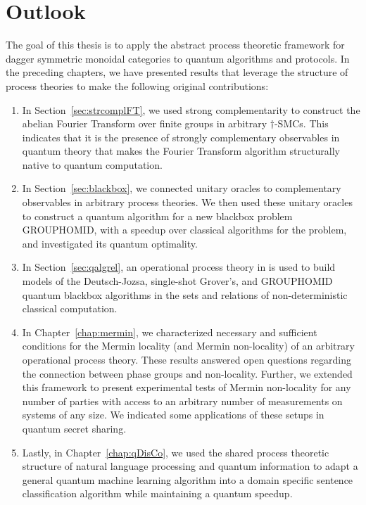 \chapter{Outlook}
\label{chap:outlook}

The goal of this thesis is to apply the abstract process theoretic framework for dagger symmetric monoidal categories to quantum algorithms and protocols.  In the preceding chapters, we have presented results that leverage the structure of process theories to make the following original contributions:
\begin{enumerate}
\item In Section~\ref{sec:strcomplFT}, we used strong complementarity to construct the abelian Fourier Transform over finite groups in arbitrary $\dagger$-SMCs. This indicates that it is the presence of strongly complementary observables in quantum theory that makes the Fourier Transform algorithm structurally native to quantum computation.

\item In Section~\ref{sec:blackbox}, we connected unitary oracles to complementary observables in arbitrary process theories. We then used these unitary oracles to construct a quantum algorithm for a new blackbox problem GROUPHOMID, with a speedup over classical algorithms for the problem, and investigated its quantum optimality.

\item In Section~\ref{sec:qalgrel}, an operational process theory in  is used to build models of the Deutsch-Jozsa, single-shot Grover's, and GROUPHOMID quantum blackbox algorithms in the sets and relations of non-deterministic classical computation.

\item In Chapter~\ref{chap:mermin}, we characterized necessary and sufficient conditions for the Mermin locality (and Mermin non-locality) of an arbitrary operational process theory. These results answered open questions regarding the connection between phase groups and non-locality. Further, we extended this framework to present experimental tests of Mermin non-locality for any number of parties with access to an arbitrary number of measurements on systems of any size. We indicated some applications of these setups in quantum secret sharing.

\item Lastly, in Chapter~\ref{chap:qDisCo}, we used the shared process theoretic structure of natural language processing and quantum information to adapt a general quantum machine learning algorithm into a domain specific sentence classification algorithm while maintaining a quantum speedup.
\end{enumerate}

